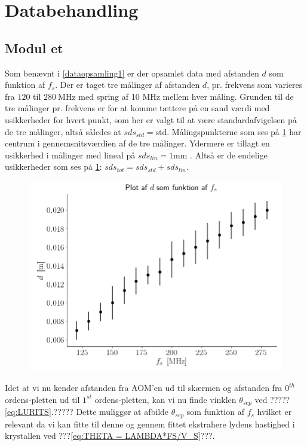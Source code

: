 \documentclass[main]{subfiles}
\begin{document}
\section{Databehandling}
\subsection{Modul et}
Som benævnt i \cref{dataopsamling1} er der opsamlet data med afstanden $d$ som funktion af $f_s$. Der er taget tre målinger af afstanden $d$, pr. frekvens som varieres fra $120$ til $280 \ \si{\mega\hertz}$ med spring af 10 $\si{\mega\hertz}$ mellem hver måling. Grunden til de tre målinger pr. frekvens er for at komme tættere på en sand værdi med usikkerheder for hvert punkt, som her er valgt til at være standardafvigelsen på de tre målinger, altså således at $sds_{std} = \text{std}$. Målingspunkterne som ses på \cref{fig:rawdata_modul1} har centrum i gennemsnitsværdien af de tre målinger. Ydermere er tillagt en usikkerhed i målinger med lineal på
$ sds_{lin} = 1 \si{\milli\meter} $ . Altså er de endelige usikkerheder som ses på \cref{fig:rawdata_modul1}:  $ sds_{tot} = sds_{std} + sds_{lin} $.
\begin{figure}[H]
    \centering
    \includegraphics[width=\linewidth]{tegninger/rawdata_modul1.png}
    \caption{}
    \label{fig:rawdata_modul1}
\end{figure}
Idet at vi nu kender afstanden fra AOM'en ud til skærmen og afstanden fra $0^{th}$ ordens-pletten ud til $1^{st}$ ordens-pletten, kan vi nu finde vinklen $\theta_{sep}$ ved ?????\cref{eq:LURITS}.?????%
Dette muliggør at afbilde $\theta_{sep}$ som funktion af $f_s$ hvilket er relevant da vi kan fitte til denne og gennem fittet ekstrahere lydens hastighed i krystallen ved ???\cref{eq:THETA = LAMBDA*FS/V_S}???. %
\end{document}
